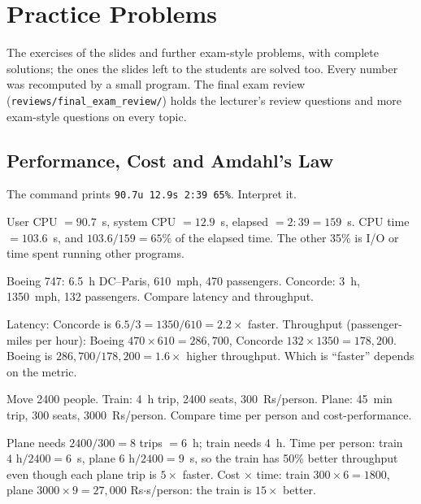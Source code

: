 \section{Practice Problems}
\label{sec:practice}

The exercises of the slides and further exam-style problems, with complete
solutions; the ones the slides left to the students are solved too. Every number
was recomputed by a small program. The final exam review
(\texttt{reviews/final\_exam\_review/}) holds the lecturer's review questions and
more exam-style questions on every topic.

\providecommand{\enc}[2]{\par{\centering\texttt{#1} $=$ \texttt{#2}\par}}

\subsection{Performance, Cost and Amdahl's Law}

\begin{exercise}
The command prints \texttt{90.7u 12.9s 2:39 65\%}. Interpret it.
\end{exercise}
\begin{solution}
User CPU $=90.7$~s, system CPU $=12.9$~s, elapsed $=2{:}39=159$~s. CPU
time $=103.6$~s, and $103.6/159 = 65\%$ of the elapsed time. The other
35\% is I/O or time spent running other programs.
\end{solution}

\begin{exercise}
Boeing 747: 6.5~h DC--Paris, 610~mph, 470 passengers. Concorde: 3~h,
1350~mph, 132 passengers. Compare latency and throughput.
\end{exercise}
\begin{solution}
Latency: Concorde is $6.5/3 = 1350/610 = 2.2\times$ faster.
Throughput (passenger-miles per hour): Boeing $470\times610=286{,}700$,
Concorde $132\times1350=178{,}200$. Boeing is $286{,}700/178{,}200 =
1.6\times$ higher throughput. Which is ``faster'' depends on the metric.
\end{solution}

\begin{exercise}
Move 2400 people. Train: 4~h trip, 2400 seats, 300~Rs/person. Plane: 45~min
trip, 300 seats, 3000~Rs/person. Compare time per person and cost-performance.
\end{exercise}
\begin{solution}
Plane needs $2400/300=8$ trips $=6$~h; train needs 4~h. Time per person:
train $4\text{ h}/2400 = 6$~s, plane $6\text{ h}/2400=9$~s, so the train
has 50\% better throughput even though each plane trip is $5\times$
faster. Cost $\times$ time: train $300\times6=1800$, plane
$3000\times9=27{,}000$ Rs$\cdot$s/person: the train is $15\times$ better.
\end{solution}

